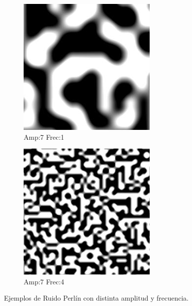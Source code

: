 \begin{figure}[H]
    \bigskip

    \begin{subfigure}{.26\textwidth}
        \centering
        \includegraphics[width=1\linewidth]{imagenes/image_generation/perlin_python_7_1.jpg}
        \caption{Amp:7 Frec:1}
    \end{subfigure}%
    \begin{subfigure}{.26\textwidth}
        \centering
        \includegraphics[width=1\linewidth]{imagenes/image_generation/perlin_python_7_4.jpg}
        \caption{Amp:7 Frec:4}
    \end{subfigure}

    \caption{Ejemplos de Ruido Perlín con distinta amplitud y frecuencia.}
\end{figure}

